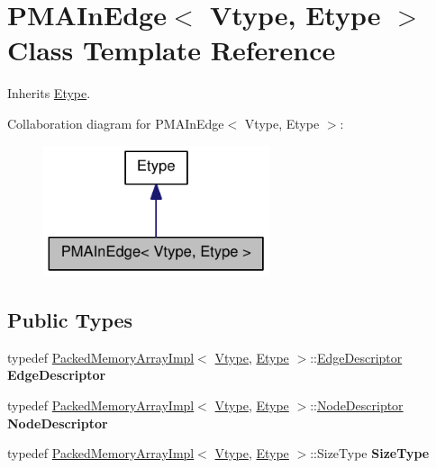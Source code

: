 \hypertarget{class_p_m_a_in_edge}{
\section{PMAInEdge$<$ Vtype, Etype $>$ Class Template Reference}
\label{class_p_m_a_in_edge}
}


Inherits \hyperlink{class_etype}{Etype}.



Collaboration diagram for PMAInEdge$<$ Vtype, Etype $>$:\nopagebreak
\begin{figure}[H]
\begin{center}
\leavevmode
\includegraphics[width=188pt]{class_p_m_a_in_edge__coll__graph}
\end{center}
\end{figure}
\subsection*{Public Types}
\begin{DoxyCompactItemize}
\item 
\hypertarget{class_p_m_a_in_edge_a5314b5e5c03ed253efaaefb16ed4df6a}{
typedef \hyperlink{class_packed_memory_array_impl}{PackedMemoryArrayImpl}$<$ \hyperlink{class_vtype}{Vtype}, \hyperlink{class_etype}{Etype} $>$::\hyperlink{class_p_m_a_edge}{EdgeDescriptor} {\bfseries EdgeDescriptor}}
\label{class_p_m_a_in_edge_a5314b5e5c03ed253efaaefb16ed4df6a}

\item 
\hypertarget{class_p_m_a_in_edge_ab6c55fe2c867b7ea76724c9ede58aa5e}{
typedef \hyperlink{class_packed_memory_array_impl}{PackedMemoryArrayImpl}$<$ \hyperlink{class_vtype}{Vtype}, \hyperlink{class_etype}{Etype} $>$::\hyperlink{class_p_m_a_node}{NodeDescriptor} {\bfseries NodeDescriptor}}
\label{class_p_m_a_in_edge_ab6c55fe2c867b7ea76724c9ede58aa5e}

\item 
\hypertarget{class_p_m_a_in_edge_aecfc3ea8f59793dc584d3fe1f9d52604}{
typedef \hyperlink{class_packed_memory_array_impl}{PackedMemoryArrayImpl}$<$ \hyperlink{class_vtype}{Vtype}, \hyperlink{class_etype}{Etype} $>$::SizeType {\bfseries SizeType}}
\label{class_p_m_a_in_edge_aecfc3ea8f59793dc584d3fe1f9d52604}

\end{DoxyCompactItemize}
